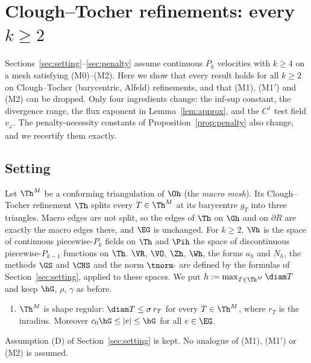 \section{Clough--Tocher refinements: every \texorpdfstring{$k\ge2$}{k>=2}}\label{ct:sec}

Sections~\ref{sec:setting}--\ref{sec:penalty} assume continuous $P_k$ velocities with $k\ge4$ on a mesh satisfying (M0)--(M2). Here we show that every result holds for all $k\ge2$ on Clough--Tocher (barycentric, Alfeld) refinements, and that (M1), (M1$'$) and (M2) can be dropped. Only four ingredients change: the inf-sup constant, the divergence range, the flux exponent in Lemma~\ref{lem:approx}, and the $C^1$ test field $v_\varphi$. The penalty-necessity constants of Proposition~\ref{prop:penalty} also change, and we recertify them exactly.

\subsection{Setting}
Let $\Th^M$ be a conforming triangulation of $\Oh$ (the \emph{macro mesh}). Its Clough--Tocher refinement $\Th$ splits every $T\in\Th^M$ at its barycentre $g_T$ into three triangles. Macro edges are not split, so the edges of $\Th$ on $\Gh$ and on $\partial R$ are exactly the macro edges there, and $\EG$ is unchanged.
For $k\ge2$, $\Vh$ is the space of continuous piecewise-$P_k$ fields on $\Th$ and $\Pih$ the space of discontinuous piecewise-$P_{k-1}$ functions on $\Th$. $\VR$, $\VO$, $\Zh$, $\Wh$, the forms $a_h$ and $N_h$, the methods $\GS$ and $\CNS$ and the norm $\tnorm\cdot$ are defined by the formulas of Section~\ref{sec:setting}, applied to these spaces.
We put $h:=\max_{T\in\Th^M}\diam T$ and keep $\hG$, $\rho$, $\gamma$ as before.

\begin{assumption}\label{ct:ass}\leavevmode
\begin{enumerate}[label=(CT\arabic*),start=0]
\item $\Th^M$ is shape regular: $\diam T\le\sigma\,r_T$ for every $T\in\Th^M$, where $r_T$ is the inradius. Moreover $c_0\hG\le|e|\le\hG$ for all $e\in\EG$.
\end{enumerate}
Assumption (D) of Section~\ref{sec:setting} is kept. No analogue of (M1), (M1$'$) or (M2) is assumed.
\end{assumption}

